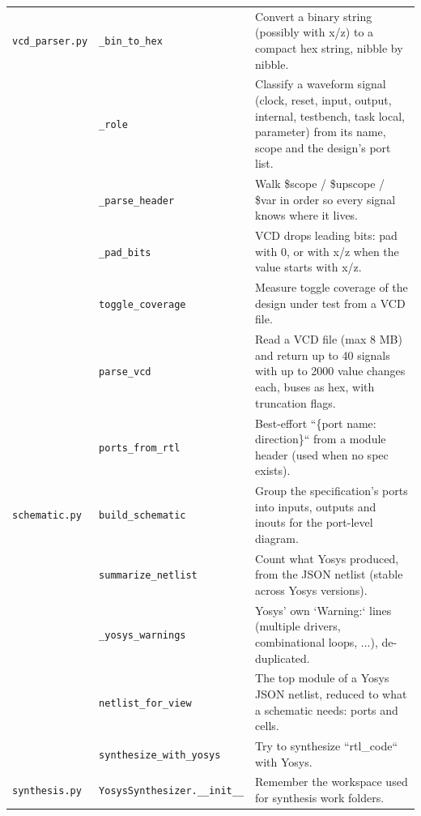 \begin{longtable}{@{}p{2.8cm}>{\raggedright\arraybackslash}p{4.6cm}p{7.9cm}@{}}
{\small \nolinkurl{vcd_parser.py}} & \texttt{\small \_\allowbreak{}bin\_\allowbreak{}to\_\allowbreak{}hex} & Convert a binary string (possibly with x/z) to a compact hex string, nibble by nibble. \\
{\small } & \texttt{\small \_\allowbreak{}role} & Classify a waveform signal (clock, reset, input, output, internal, testbench, task local, parameter) from its name, scope and the design's port list. \\
{\small } & \texttt{\small \_\allowbreak{}parse\_\allowbreak{}header} & Walk \$scope / \$upscope / \$var in order so every signal knows where it lives. \\
{\small } & \texttt{\small \_\allowbreak{}pad\_\allowbreak{}bits} & VCD drops leading bits: pad with 0, or with x/z when the value starts with x/z. \\
{\small } & \texttt{\small toggle\_\allowbreak{}coverage} & Measure toggle coverage of the design under test from a VCD file. \\
{\small } & \texttt{\small parse\_\allowbreak{}vcd} & Read a VCD file (max 8 MB) and return up to 40 signals with up to 2000 value changes each, buses as hex, with truncation flags. \\
{\small } & \texttt{\small ports\_\allowbreak{}from\_\allowbreak{}rtl} & Best-effort ``\{port name: direction\}`` from a module header (used when no spec exists). \\
{\small \nolinkurl{schematic.py}} & \texttt{\small build\_\allowbreak{}schematic} & Group the specification's ports into inputs, outputs and inouts for the port-level diagram. \\
{\small } & \texttt{\small summarize\_\allowbreak{}netlist} & Count what Yosys produced, from the JSON netlist (stable across Yosys versions). \\
{\small } & \texttt{\small \_\allowbreak{}yosys\_\allowbreak{}warnings} & Yosys' own `Warning:` lines (multiple drivers, combinational loops, ...), de-duplicated. \\
{\small } & \texttt{\small netlist\_\allowbreak{}for\_\allowbreak{}view} & The top module of a Yosys JSON netlist, reduced to what a schematic needs: ports and cells. \\
{\small } & \texttt{\small synthesize\_\allowbreak{}with\_\allowbreak{}yosys} & Try to synthesize ``rtl\_code`` with Yosys. \\
{\small \nolinkurl{synthesis.py}} & \texttt{\small YosysSynthesizer.\allowbreak \_\allowbreak{}\_\allowbreak{}init\_\allowbreak{}\_\allowbreak{}} & Remember the workspace used for synthesis work folders. \\

\end{longtable}

